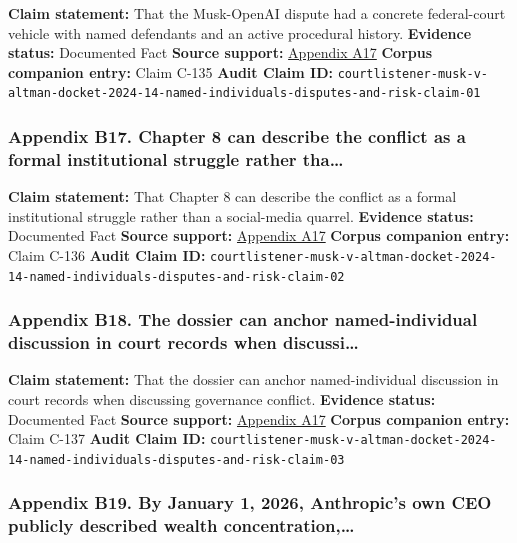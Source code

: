 \documentclass[
  american,
  11pt,
  letterpaper,
]{article}
\begin{document}
\textbf{Claim statement:} That the Musk-OpenAI dispute had a concrete
federal-court vehicle with named defendants and an active procedural
history. \textbf{Evidence status:} Documented Fact \textbf{Source
support:}
\hyperref[ch-08-appendix-a17-musk-v-altman-4-24-cv-04722]{Appendix A17}
\textbf{Corpus companion entry:} Claim C-135 \textbf{Audit Claim ID:}
\texttt{courtlistener-musk-v-altman-docket-2024-14-named-individuals-disputes-and-risk-claim-01}

\subsubsection{Appendix B17. Chapter 8 can describe the conflict as a
formal institutional struggle rather
tha\ldots{}}\label{ch-08-appendix-b17-chapter-8-can-describe-the-conflict-as-a-formal-institutional-struggle-rather-tha}

\textbf{Claim statement:} That Chapter 8 can describe the conflict as a
formal institutional struggle rather than a social-media quarrel.
\textbf{Evidence status:} Documented Fact \textbf{Source support:}
\hyperref[ch-08-appendix-a17-musk-v-altman-4-24-cv-04722]{Appendix A17}
\textbf{Corpus companion entry:} Claim C-136 \textbf{Audit Claim ID:}
\texttt{courtlistener-musk-v-altman-docket-2024-14-named-individuals-disputes-and-risk-claim-02}

\subsubsection{Appendix B18. The dossier can anchor named-individual
discussion in court records when
discussi\ldots{}}\label{ch-08-appendix-b18-the-dossier-can-anchor-named-individual-discussion-in-court-records-when-discussi}

\textbf{Claim statement:} That the dossier can anchor named-individual
discussion in court records when discussing governance conflict.
\textbf{Evidence status:} Documented Fact \textbf{Source support:}
\hyperref[ch-08-appendix-a17-musk-v-altman-4-24-cv-04722]{Appendix A17}
\textbf{Corpus companion entry:} Claim C-137 \textbf{Audit Claim ID:}
\texttt{courtlistener-musk-v-altman-docket-2024-14-named-individuals-disputes-and-risk-claim-03}

\subsubsection{Appendix B19. By January 1, 2026, Anthropic's own CEO
publicly described wealth
concentration,\ldots{}}\label{ch-08-appendix-b19-by-january-1-2026-anthropic-s-own-ceo-publicly-described-wealth-concentration}
\end{document}
